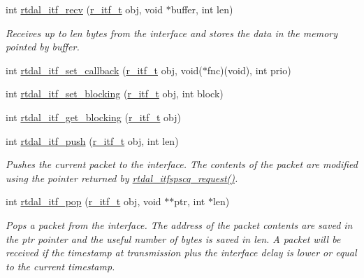 \begin{DoxyCompactItemize}
int \hyperlink{group__itf_ga7013c5b24cc019f3112b341207f3d1ae}{rtdal\-\_\-itf\-\_\-recv} (\hyperlink{rtdal__types_8h_a95fa1c8ca0f279eeb420f2083f6bee5d}{r\-\_\-itf\-\_\-t} obj, void $\ast$buffer, int len)
\begin{DoxyCompactList}\small\item\em Receives up to len bytes from the interface and stores the data in the memory pointed by buffer. \end{DoxyCompactList}\item 
int \hyperlink{group__itf_ga61bc95f47b787b54c314ed1971739cdd}{rtdal\-\_\-itf\-\_\-set\-\_\-callback} (\hyperlink{rtdal__types_8h_a95fa1c8ca0f279eeb420f2083f6bee5d}{r\-\_\-itf\-\_\-t} obj, void($\ast$fnc)(void), int prio)
\item 
int \hyperlink{group__itf_gabd0a2a54a5bc12226a90930ddccbc146}{rtdal\-\_\-itf\-\_\-set\-\_\-blocking} (\hyperlink{rtdal__types_8h_a95fa1c8ca0f279eeb420f2083f6bee5d}{r\-\_\-itf\-\_\-t} obj, int block)
\item 
int \hyperlink{group__itf_gaf0367f49b66b46e0b22af3ca9f30f34f}{rtdal\-\_\-itf\-\_\-get\-\_\-blocking} (\hyperlink{rtdal__types_8h_a95fa1c8ca0f279eeb420f2083f6bee5d}{r\-\_\-itf\-\_\-t} obj)
\item 
int \hyperlink{group__itf_gab87fe53e0cb855f2633c07079721464e}{rtdal\-\_\-itf\-\_\-push} (\hyperlink{rtdal__types_8h_a95fa1c8ca0f279eeb420f2083f6bee5d}{r\-\_\-itf\-\_\-t} obj, int len)
\begin{DoxyCompactList}\small\item\em Pushes the current packet to the interface. The contents of the packet are modified using the pointer returned by \hyperlink{rtdal__itfspscq_8c_ad993aed16e1a3468f2cfc9de52a0b8ce}{rtdal\-\_\-itfspscq\-\_\-request()}. \end{DoxyCompactList}\item 
int \hyperlink{group__itf_ga2a083a0b484685e86b520381e394da8c}{rtdal\-\_\-itf\-\_\-pop} (\hyperlink{rtdal__types_8h_a95fa1c8ca0f279eeb420f2083f6bee5d}{r\-\_\-itf\-\_\-t} obj, void $\ast$$\ast$ptr, int $\ast$len)
\begin{DoxyCompactList}\small\item\em Pops a packet from the interface. The address of the packet contents are saved in the ptr pointer and the useful number of bytes is saved in len. A packet will be received if the timestamp at transmission plus the interface delay is lower or equal to the current timestamp. \end{DoxyCompactList}\item 
$$
\end{DoxyCompactItemize}
